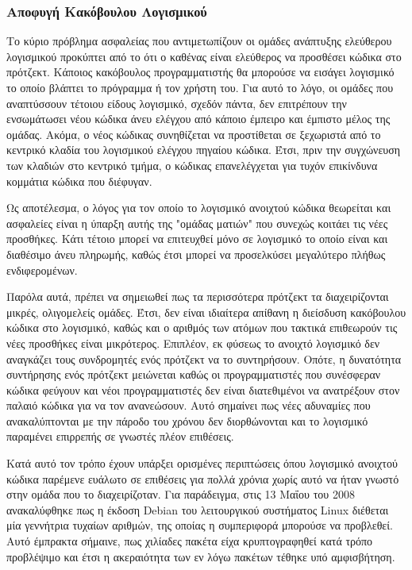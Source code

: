 \documentclass[a4paper, 11pt]{article}
\begin{document}
{{\subsubsection{Αποφυγή Κακόβουλου Λογισμικού}

Το κύριο πρόβλημα ασφαλείας που αντιμετωπίζουν οι ομάδες ανάπτυξης ελεύθερου λογισμικού προκύπτει από το ότι ο καθένας είναι ελεύθερος να προσθέσει κώδικα στο πρότζεκτ. Κάποιος κακόβουλος προγραμματιστής θα μπορούσε να εισάγει λογισμικό το οποίο βλάπτει το πρόγραμμα ή τον χρήστη του. Για αυτό το λόγο, οι ομάδες που αναπτύσσουν τέτοιου είδους λογισμικό, σχεδόν πάντα, δεν επιτρέπουν την ενσωμάτωσει νέου κώδικα άνευ ελέγχου από κάποιο έμπειρο και έμπιστο μέλος της ομάδας. Ακόμα, ο νέος κώδικας συνηθίζεται να προστίθεται σε ξεχωριστά από το κεντρικό κλαδία του λογισμικού ελέγχου πηγαίου κώδικα. Έτσι, πριν την συγχώνευση των κλαδιών στο κεντρικό τμήμα, ο κώδικας επανελέγχεται για τυχόν επικίνδυνα κομμάτια κώδικα που διέφυγαν.

Ως αποτέλεσμα, ο λόγος για τον οποίο το λογισμικό ανοιχτού κώδικα θεωρείται και ασφαλείες είναι η ύπαρξη αυτής της "ομάδας ματιών" που συνεχώς κοιτάει τις νέες προσθήκες. Κάτι τέτοιο μπορεί να επιτευχθεί μόνο σε λογισμικό το οποίο είναι και διαθέσιμο άνευ πληρωμής, καθώς έτσι μπορεί να προσελκύσει μεγαλύτερο πλήθως ενδιφερομένων.

Παρόλα αυτά, πρέπει να σημειωθεί πως τα περισσότερα πρότζεκτ τα διαχειρίζονται μικρές, ολιγομελείς ομάδες. Έτσι, δεν είναι ιδιαίτερα απίθανη η διείσδυση κακόβουλου κώδικα στο λογισμικό, καθώς και ο αριθμός των ατόμων που τακτικά επιθεωρούν τις νέες προσθήκες είναι μικρότερος. Επιπλέον, εκ φύσεως το ανοιχτό λογισμικό δεν αναγκάζει τους συνδρομητές ενός πρότζεκτ να το συντηρήσουν. Οπότε, η δυνατότητα συντήρησης ενός πρότζεκτ μειώνεται καθώς οι προγραμματιστές που συνέσφεραν κώδικα φεύγουν και νέοι προγραμματιστές δεν είναι διατεθιμένοι να ανατρέξουν στον παλαιό κώδικα για να τον ανανεώσουν. Αυτό σημαίνει πως νέες αδυναμίες που ανακαλύπτονται με την πάροδο του χρόνου δεν διορθώνονται και το λογισμικό παραμένει επιρρεπής σε γνωστές πλέον επιθέσεις.

Κατά αυτό τον τρόπο έχουν υπάρξει ορισμένες περιπτώσεις όπου λογισμικό ανοιχτού κώδικα παρέμενε ευάλωτο σε επιθέσεις για πολλά χρόνια χωρίς αυτό να ήταν γνωστό στην ομάδα που το διαχειρίζοταν. Για παράδειγμα, στις 13
Μαΐου του 2008 ανακαλύφθηκε πως η έκδοση \textlatin{Debian} του λειτουργικού συστήματος \textlatin{Linux} διέθεται μία γεννήτρια τυχαίων αριθμών, της οποίας η συμπεριφορά μπορούσε να προβλεθεί. Αυτό έμπρακτα σήμαινε, πως χιλίαδες πακέτα είχα κρυπτογραφηθεί κατά τρόπο προβλέψιμο και έτσι η ακεραιότητα των εν λόγω πακέτων τέθηκε υπό αμφισβήτηση.

}}
\end{document}
